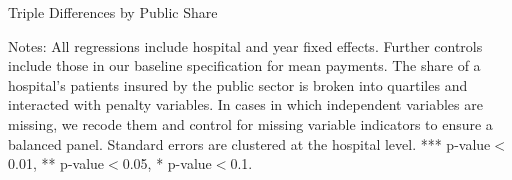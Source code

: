 \documentclass[12pt]{article}
\begin{document}
\newpage
{}
\setlength{\captionmargin}{.5 \textwidth} \addtolength{\captionmargin}{-.5\wd\gfxbox}
\begin{table}[htbp!]
\centering
\caption{Triple Differences by Public Share}
\label{tab:publicshare}
\usebox{\gfxbox}
\par
\begin{minipage}{\wd\gfxbox}
\footnotesize
Notes: All regressions include hospital and year fixed effects.  Further controls include those in our baseline specification for mean payments.  The share of a hospital's patients insured by the public sector is broken into quartiles and interacted with penalty variables.  In cases in which independent variables are missing, we recode them and control for missing variable indicators to ensure a balanced panel.  Standard errors are clustered at the hospital level.  *** p-value$<$0.01, ** p-value$<$0.05, * p-value$<$0.1.
\end{minipage}
\end{table}
\end{document}
